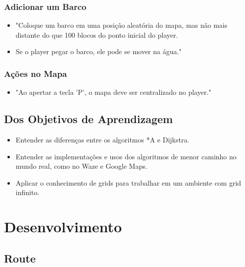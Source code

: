 \documentclass[
	12pt,				%
	oneside,			%
	a4paper,			%
	english,			%
	brazil,				%
	]{abntex2}
\begin{document}
{\begin{itemize}
\end{itemize}

\subsubsection{Adicionar um Barco}

\begin{itemize}
    \item "Coloque um barco em uma posição aleatória do mapa, mas não mais distante do que 100 blocos do ponto inicial do player.
    \item Se o player pegar o barco, ele pode se mover na água."
\end{itemize}

\subsubsection{Ações no Mapa}

\begin{itemize}
    \item "Ao apertar a tecla 'P', o mapa deve ser centralizado no player."
\end{itemize}

\subsection{Dos Objetivos de Aprendizagem}\label{sub:dos_objetivos_de_aprendizagem} %

\begin{itemize}
    \item Entender as diferenças entre os algoritmos *A e Dijkstra.
    \item Entender as implementações e usos dos algoritmos de menor caminho no mundo real, como no Waze e Google Maps.
    \item Aplicar o conhecimento de grids para trabalhar em um ambiente com grid infinito.
\end{itemize}

\section{Desenvolvimento}

\subsection{Route}\label{sub:route} %

}
\end{document}
